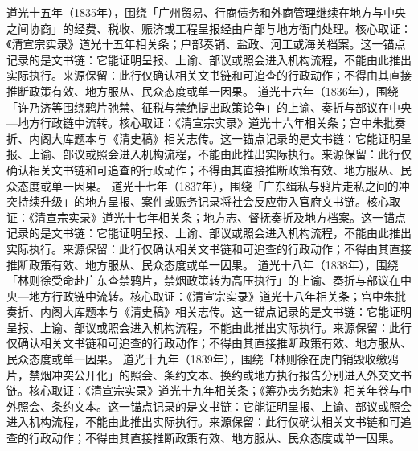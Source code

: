 道光十五年（1835年），围绕「广州贸易、行商债务和外商管理继续在地方与中央之间协商」的经费、税收、赈济或工程呈报经由户部与地方衙门处理。核心取证：《清宣宗实录》道光十五年相关条；户部奏销、盐政、河工或海关档案。这一锚点记录的是文书链：它能证明呈报、上谕、部议或照会进入机构流程，不能由此推出实际执行。来源保留：此行仅确认相关文书链和可追查的行政动作；不得由其直接推断政策有效、地方服从、民众态度或单一因果。
道光十六年（1836年），围绕「许乃济等围绕鸦片弛禁、征税与禁绝提出政策论争」的上谕、奏折与部议在中央—地方行政链中流转。核心取证：《清宣宗实录》道光十六年相关条；宫中朱批奏折、内阁大库题本与《清史稿》相关志传。这一锚点记录的是文书链：它能证明呈报、上谕、部议或照会进入机构流程，不能由此推出实际执行。来源保留：此行仅确认相关文书链和可追查的行政动作；不得由其直接推断政策有效、地方服从、民众态度或单一因果。
道光十七年（1837年），围绕「广东缉私与鸦片走私之间的冲突持续升级」的地方呈报、案件或赈务记录将社会反应带入官府文书链。核心取证：《清宣宗实录》道光十七年相关条；地方志、督抚奏折及地方档案。这一锚点记录的是文书链：它能证明呈报、上谕、部议或照会进入机构流程，不能由此推出实际执行。来源保留：此行仅确认相关文书链和可追查的行政动作；不得由其直接推断政策有效、地方服从、民众态度或单一因果。
道光十八年（1838年），围绕「林则徐受命赴广东查禁鸦片，禁烟政策转为高压执行」的上谕、奏折与部议在中央—地方行政链中流转。核心取证：《清宣宗实录》道光十八年相关条；宫中朱批奏折、内阁大库题本与《清史稿》相关志传。这一锚点记录的是文书链：它能证明呈报、上谕、部议或照会进入机构流程，不能由此推出实际执行。来源保留：此行仅确认相关文书链和可追查的行政动作；不得由其直接推断政策有效、地方服从、民众态度或单一因果。
道光十九年（1839年），围绕「林则徐在虎门销毁收缴鸦片，禁烟冲突公开化」的照会、条约文本、换约或地方执行报告分别进入外交文书链。核心取证：《清宣宗实录》道光十九年相关条；《筹办夷务始末》相关年卷与中外照会、条约文本。这一锚点记录的是文书链：它能证明呈报、上谕、部议或照会进入机构流程，不能由此推出实际执行。来源保留：此行仅确认相关文书链和可追查的行政动作；不得由其直接推断政策有效、地方服从、民众态度或单一因果。
